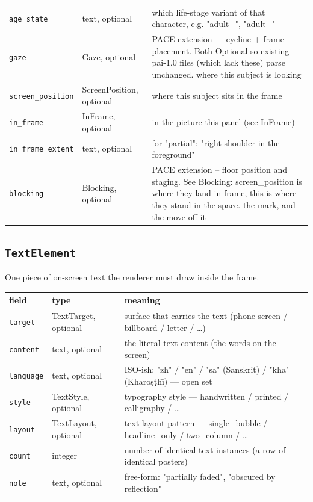 \begin{longtable}{@{}R{0.24\textwidth}R{0.21\textwidth}R{0.49\textwidth}@{}}
\texttt{age\_\allowbreak state} & text, optional & which life-stage variant of that character, e.g. "adult\_", "adult\_" \\
\texttt{gaze} & Gaze, optional & PACE extension ---\allowbreak{} eyeline + frame placement. Both Optional so existing pai-1.0 files (which lack these) parse unchanged. where this subject is looking \\
\texttt{screen\_\allowbreak position} & ScreenPosition, optional & where this subject sits in the frame \\
\texttt{in\_\allowbreak frame} & InFrame, optional & in the picture this panel (see InFrame) \\
\texttt{in\_\allowbreak frame\_\allowbreak extent} & text, optional & for "partial": "right shoulder in the foreground" \\
\texttt{blocking} & Blocking, optional & PACE extension -- floor position and staging. See Blocking: screen\_\allowbreak position is where they land in frame, this is where they stand in the space. the mark, and the move off it \\
\bottomrule
\end{longtable}

\subsection*{\texttt{TextElement}}
\noindent One piece of on-screen text the renderer must draw inside the frame.

\begin{longtable}{@{}R{0.24\textwidth}R{0.21\textwidth}R{0.49\textwidth}@{}}
\toprule \textbf{field} & \textbf{type} & \textbf{meaning} \\ \midrule
\endhead
\texttt{target} & TextTarget, optional & surface that carries the text (phone screen /\allowbreak{} billboard /\allowbreak{} letter /\allowbreak{} \ldots{}) \\
\texttt{content} & text, optional & the literal text content (the words on the screen) \\
\texttt{language} & text, optional & ISO-ish: "zh" /\allowbreak{} "en" /\allowbreak{} "sa" (Sanskrit) /\allowbreak{} "kha" (Kharo\d{s}\d{t}h\={\i}) ---\allowbreak{} open set \\
\texttt{style} & TextStyle, optional & typography style ---\allowbreak{} handwritten /\allowbreak{} printed /\allowbreak{} calligraphy /\allowbreak{} \ldots{} \\
\texttt{layout} & TextLayout, optional & text layout pattern ---\allowbreak{} single\_\allowbreak bubble /\allowbreak{} headline\_\allowbreak only /\allowbreak{} two\_\allowbreak column /\allowbreak{} \ldots{} \\
\texttt{count} & integer & number of identical text instances (a row of identical posters) \\
\texttt{note} & text, optional & free-form: "partially faded", "obscured by reflection" \\
\bottomrule
\end{longtable}

